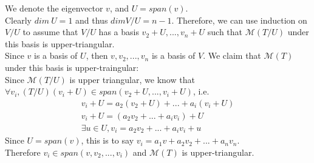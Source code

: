 \documentclass{article}
\begin{document}
\begin{addmargin}[1em]{0em}
    We denote the eigenvector $v$, and $U = span(v)$.\\
    Clearly $dim\ U = 1$ and thus $dim V/U = n-1$. Therefore, we can use induction on $V/U$ to assume that $V/U$ has a basis $v_2+U, ..., v_n + U$ such that $\mathcal{M}(T/U)$ under this basis is upper-triangular.\\
    Since $v$ is a basis of $U$, then $v, v_2, ..., v_n$ is a basis of $V$. We claim that $\mathcal{M}(T)$ under this basis is upper-traingular:\\
    Since $\mathcal{M}(T/U)$ is upper triangular, we know that $\forall v_i, (T/U)(v_i+U) \in span(v_2 + U, ..., v_i + U)$, i.e.
    \begin{equation*}
        \begin{split}
            v_i + U = a_2(v_2+U) + ... + a_i(v_i + U)\\
            v_i + U = (a_2v_2 + ... + a_iv_i) + U\\
            \exists u \in U, v_i = a_2v_2 + ... + a_iv_i + u
        \end{split}
    \end{equation*}
    Since $U = span(v)$, this is to say $v_i = a_1v + a_2v_2 + ... + a_nv_n$.\\
    Therefore $v_i \in span(v, v_2, ..., v_i)$ and $\mathcal{M}(T)$ is upper-triangular.
\end{addmargin}
\end{document}
